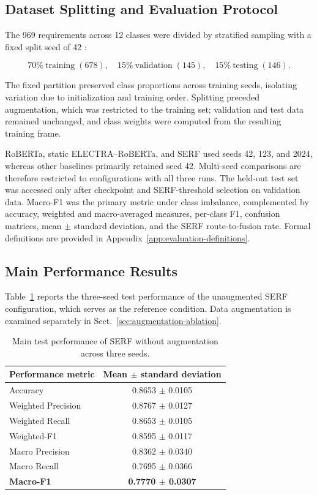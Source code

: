 \documentclass[runningheads]{llncs}
\begin{document}
\subsection{Dataset Splitting and Evaluation Protocol}\label{sec:dataset-splitting}

The 969 requirements across 12 classes were divided by stratified sampling with a fixed split seed of 42 \cite{lima_promise_exp}:

\[
70\%~\text{training} \;(678),\quad
15\%~\text{validation} \;(145),\quad
15\%~\text{testing} \;(146).
\]

The fixed partition preserved class proportions across training seeds, isolating variation due to initialization and training order. Splitting preceded augmentation, which was restricted to the training set; validation and test data remained unchanged, and class weights were computed from the resulting training frame.

RoBERTa, static ELECTRA--RoBERTa, and SERF used seeds 42, 123, and 2024, whereas other baselines primarily retained seed 42. Multi-seed comparisons are therefore restricted to configurations with all three runs. The held-out test set was accessed only after checkpoint and SERF-threshold selection on validation data. Macro-F1 was the primary metric under class imbalance, complemented by accuracy, weighted and macro-averaged measures, per-class F1, confusion matrices, mean \(\pm\) standard deviation, and the SERF route-to-fusion rate. Formal definitions are provided in Appendix~\ref{app:evaluation-definitions}.

\subsection{Main Performance Results}\label{sec:main-results}

Table~\ref{tab:serf-main-performance} reports the three-seed test performance of the unaugmented SERF configuration, which serves as the reference condition. Data augmentation is examined separately in Sect.~\ref{sec:augmentation-ablation}.

\begin{table}[!t]
\caption{Main test performance of SERF without augmentation across three seeds.}\label{tab:serf-main-performance}
\centering
\setlength{\tabcolsep}{4pt}
\small
\begin{tabular}{lc}
\toprule
\textbf{Performance metric} & \textbf{Mean \ensuremath{\pm} standard deviation} \\
\midrule
Accuracy & 0.8653 \ensuremath{\pm} 0.0105 \\
Weighted Precision & 0.8767 \ensuremath{\pm} 0.0127 \\
Weighted Recall & 0.8653 \ensuremath{\pm} 0.0105 \\
Weighted-F1 & 0.8595 \ensuremath{\pm} 0.0117 \\
Macro Precision & 0.8362 \ensuremath{\pm} 0.0340 \\
Macro Recall & 0.7695 \ensuremath{\pm} 0.0366 \\
\textbf{Macro-F1} & \textbf{0.7770 \ensuremath{\pm} 0.0307} \\
\bottomrule
\end{tabular}
\end{table}
\end{document}
